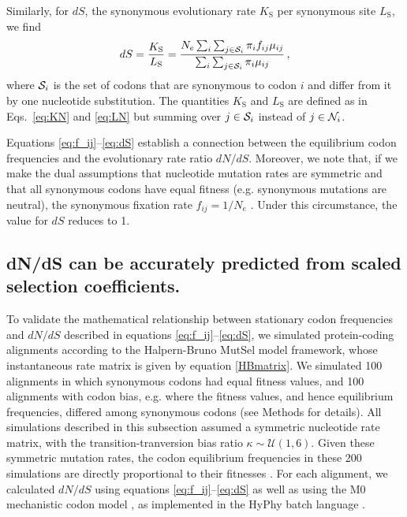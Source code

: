\documentclass{pnastwo}
\begin{document}
\begin{article}
Similarly, for $dS$, the synonymous evolutionary rate $K_\text{S}$ per synonymous site $L_\text{S}$, we find
\begin{equation}\label{eq:dS}
  dS = \frac{K_\text{S}}{L_\text{S}}=\frac{ N_e \sum_i \sum_{j \in {\cal S}_i} \pi_i f_{ij} \mu_{ij} } {\sum_i \sum_{j \in {\cal S}_i} \pi_i \mu_{ij} }\,,
\end{equation}
where ${\cal S}_i$ is the set of codons that are synonymous to codon $i$ and differ from it by one nucleotide substitution. The quantities $K_\text{S}$ and $L_\text{S}$ are defined as in Eqs.~\eqref{eq:KN} and \eqref{eq:LN} but summing over $j\in {\cal S}_i$ instead of $j\in {\cal N}_i$.

Equations \eqref{eq:f_ij}--\eqref{eq:dS} establish a connection between the equilibrium codon frequencies and the evolutionary rate ratio $dN/dS$. Moreover, we note that, if we make the dual assumptions that nucleotide mutation rates are symmetric and that all synonymous codons have equal fitness (e.g. synonymous mutations are neutral), the synonymous fixation rate $f_{ij}= 1/N_e$ \cite{CrowKimura1970}. Under this circumstance, the value for $dS$ reduces to 1.

\subsection*{dN/dS can be accurately predicted from scaled selection coefficients.}

To validate the mathematical relationship between stationary codon frequencies and $dN/dS$ described in equations \eqref{eq:f_ij}--\eqref{eq:dS}, we simulated protein-coding alignments according to the Halpern-Bruno \cite{HalpernBruno1998} MutSel model framework, whose instantaneous rate matrix is given by equation \eqref{HBmatrix}. We simulated 100 alignments in which synonymous codons had equal fitness values, and 100 alignments with codon bias, e.g. where the fitness values, and hence equilibrium frequencies, differed among synonymous codons (see Methods for details). All simulations described in this subsection assumed  a symmetric nucleotide rate matrix, with the transition-tranversion bias ratio $\kappa \sim \mathcal{U}(1,6)$. Given these symmetric mutation rates, the codon equilibrium frequencies in these 200 simulations are directly proportional to their fitnesses \cite{SellaHirsh2005}. For each alignment, we calculated $dN/dS$ using equations \eqref{eq:f_ij}--\eqref{eq:dS} as well as using the M0 mechanistic codon model \cite{NielsenYang1998}, as implemented in the HyPhy batch language \cite{KosakovskyPondetal2005}.


\end{article}
\end{document}
